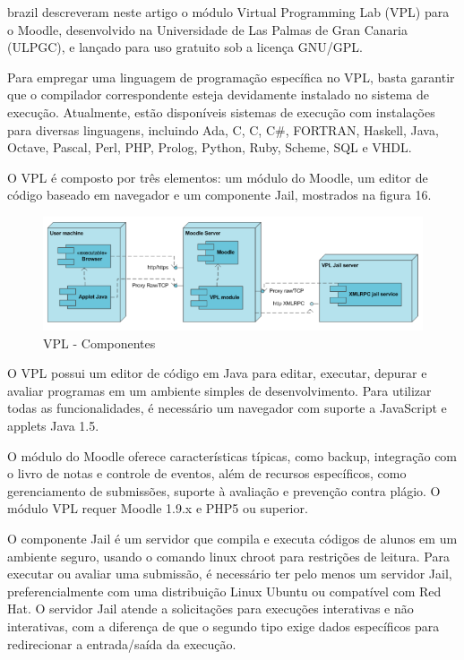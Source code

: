 \begin{otherlanguage*}{brazil}
\textcite{rodriguezdelpinoandroyo} descreveram neste artigo o módulo Virtual Programming Lab (VPL) para o Moodle, desenvolvido na Universidade de Las Palmas de Gran Canaria (ULPGC), e lançado para uso gratuito sob a licença GNU/GPL.

Para empregar uma linguagem de programação específica no VPL, basta garantir que o compilador correspondente esteja devidamente instalado no sistema de execução. Atualmente, estão disponíveis sistemas de execução com instalações para diversas linguagens, incluindo Ada, C, C\+\+, C\#, FORTRAN, Haskell, Java, Octave, Pascal, Perl, PHP, Prolog, Python, Ruby, Scheme, SQL e VHDL.
 
O VPL é composto por três elementos: um módulo do Moodle, um editor de código baseado em navegador e um componente Jail, mostrados na figura 16.

\begin{figure}[h!]
	   \centering
            \caption{VPL - Componentes}
            \label{fig:ModeloConceitual}
	   	\includegraphics[scale=0.3]{pictures/VPL_componentes.png}
\end{figure}

O VPL possui um editor de código em Java para editar, executar, depurar e avaliar programas em um ambiente simples de desenvolvimento. Para utilizar todas as funcionalidades, é necessário um navegador com suporte a JavaScript e applets Java 1.5. 

O módulo do Moodle oferece características típicas, como backup, integração com o livro de notas e controle de eventos, além de recursos específicos, como gerenciamento de submissões, suporte à avaliação e prevenção contra plágio. O módulo VPL requer Moodle 1.9.x e PHP5 ou superior. 

O componente Jail é um servidor que compila e executa códigos de alunos em um ambiente seguro, usando o comando linux chroot para restrições de leitura. Para executar ou avaliar uma submissão, é necessário ter pelo menos um servidor Jail, preferencialmente com uma distribuição Linux Ubuntu ou compatível com Red Hat. O servidor Jail atende a solicitações para execuções interativas e não interativas, com a diferença de que o segundo tipo exige dados específicos para redirecionar a entrada/saída da execução. 


\end{otherlanguage*}
